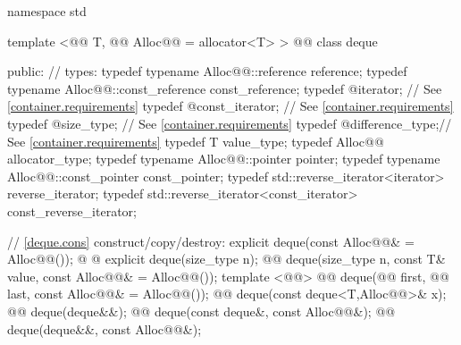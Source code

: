 \documentclass[american,twoside]{book}
\begin{document}
\begin{codeblock}
namespace std {
  template <@@ T, @@ Alloc@@ = allocator<T> >
  @@
  class deque {
  public:
    // types:
    typedef typename Alloc@@::reference         reference;
    typedef typename Alloc@@::const_reference   const_reference;
    typedef @\impdef@                iterator;       // See \ref{container.requirements}
    typedef @\impdef@                const_iterator; // See \ref{container.requirements}
    typedef @\impdef@                size_type;      // See \ref{container.requirements}
    typedef @\impdef@                difference_type;// See \ref{container.requirements}
    typedef T                                     value_type;
    typedef Alloc@@                             allocator_type;
    typedef typename Alloc@@::pointer           pointer;
    typedef typename Alloc@@::const_pointer     const_pointer;
    typedef std::reverse_iterator<iterator>       reverse_iterator;
    typedef std::reverse_iterator<const_iterator> const_reverse_iterator;

    // \ref{deque.cons} construct/copy/destroy:
    explicit deque(const Alloc@@& = Alloc@@());
    @ @ explicit deque(size_type n);
    @@ 
      deque(size_type n, const T& value, const Alloc@@& = Alloc@@());
    template <@@>
      @@ 
      deque(@@ first, @@ last, const Alloc@@& = Alloc@@());
    @@ deque(const deque<T,Alloc@@>& x);
    @@ deque(deque&&);
    @@ deque(const deque&, const Alloc@@&);
    @@ deque(deque&&, const Alloc@@&);

}}
\end{codeblock}
\end{document}
